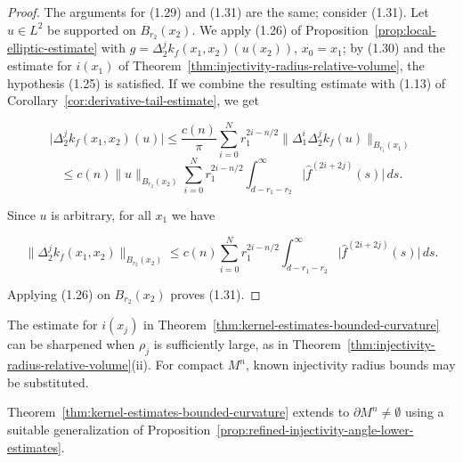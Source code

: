 \begin{proof}
\sketch The arguments for (1.29) and (1.31) are the same; consider (1.31).
Let $u \in L^2$ be supported on
$B_{r_2}(x_2)$. We apply (1.26) of Proposition~\ref{prop:local-elliptic-estimate} with
$g = \Delta_2^j k_f(x_1,x_2)(u(x_2))$, $x_0 = x_1$; by (1.30) and the estimate
for $i(x_1)$ of Theorem~\ref{thm:injectivity-radius-relative-volume}, the hypothesis (1.25) is satisfied. If we combine
the resulting estimate with (1.13) of Corollary~\ref{cor:derivative-tail-estimate}, we get

\begin{equation}\tag{1.32}
\bigl|\Delta_2^j k_f(x_1,x_2)(u)\bigr| \leq \frac{c(n)}{\pi}\sum_{i=0}^N r_1^{2i-n/2}
\bigl\|\Delta_1^i \Delta_2^j k_f(u)\bigr\|_{B_{r_1}(x_1)}
\end{equation}
\[
\leq c(n)\|u\|_{B_{r_2}(x_2)} \sum_{i=0}^N r_1^{2i-n/2}
\int_{d-r_1-r_2}^\infty \bigl|\hat f^{(2i+2j)}(s)\bigr|\,ds.
\]

Since $u$ is arbitrary, for all $x_1$ we have

\begin{equation}\tag{1.33}
\bigl\|\Delta_2^j k_f(x_1,x_2)\bigr\|_{B_{r_2}(x_2)}
\leq c(n)\sum_{i=0}^N r_1^{2i-n/2} \int_{d-r_1-r_2}^\infty \bigl|\hat f^{(2i+2j)}(s)\bigr|\,ds.
\end{equation}

Applying (1.26) on $B_{r_2}(x_2)$ proves (1.31).
\end{proof}

\begin{remark}
\label{rem:sectional-curvature-kernel-estimate}

The estimate for $i(x_j)$ in Theorem~\ref{thm:kernel-estimates-bounded-curvature} can be sharpened when $\rho_j$ is
sufficiently large, as in Theorem~\ref{thm:injectivity-radius-relative-volume}(ii). For compact $M^n$, known injectivity
radius bounds may be substituted.
\end{remark}

Theorem~\ref{thm:kernel-estimates-bounded-curvature} extends to $\partial M^n\ne\emptyset$ using a suitable
generalization of Proposition~\ref{prop:refined-injectivity-angle-lower-estimates}.
